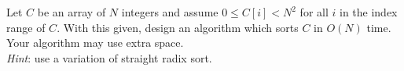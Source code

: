 Let $C$ be an array of $N$ integers and assume
$0 \leq  C[i] < N^{2}$ for all $i$ in the index range of $C$.
With this given,
design an algorithm which sorts $C$ in $O(N)$ time.  Your algorithm may use
extra space.  \\
{\em Hint}: use a variation of straight radix sort.
